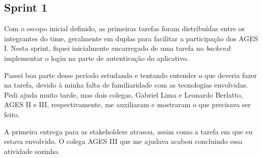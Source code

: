 \subsection{Sprint 1}

Com o escopo inicial definido, as primeiras tarefas foram distribuídas entre
os integrantes do time, geralmente em duplas para facilitar a participação dos
AGES I. Nesta sprint, fiquei inicialmente encarregado de uma tarefa no
\textit{backend}: implementar o login na parte de autenticação do aplicativo.

Passei boa parte desse período estudando e tentando entender o que deveria
fazer na tarefa, devido à minha falta de familiaridade com as tecnologias
envolvidas. Pedi ajuda muito tarde, mas dois colegas, Gabriel Lima e Leonardo
Berlatto, AGES II e III, respectivamente, me auxiliaram e mostraram o que
precisava ser feito.

A primeira entrega para as stakeholders atrasou, assim como a tarefa em que
eu estava envolvido. O colega AGES III que me ajudava acabou concluindo essa
atividade sozinho.
\medskip

\noindent{}
